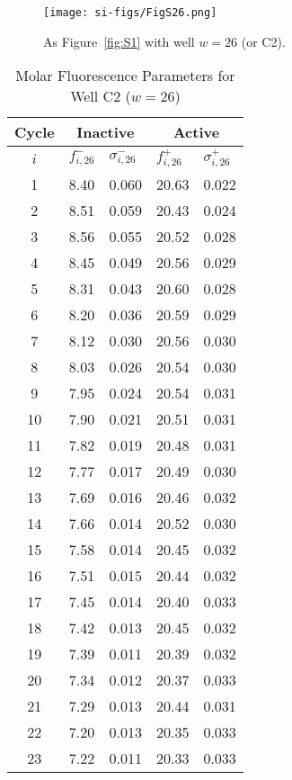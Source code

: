                 \begin{figure}
                    \centering
                    \texttt{[image: si-figs/FigS26.png]}
                    \caption{
                        As Figure~\ref{fig:S1} with well $w=26$ (or C2).
                    }
                \end{figure}
                \clearpage
    \begin{table}
        \caption{Molar Fluorescence Parameters for Well C2 ($w=26$)}
        \centering
        \begin{tabular}{c|ll|ll}
            Cycle & \multicolumn{2}{c|}{Inactive} & \multicolumn{2}{c}{Active} \\
            \hline
            $i$ & $f_{i,26}^{-}$ & $\sigma_{i,26}^{-}$ &  $f_{i,26}^{+}$ & $\sigma_{i,26}^{+}$ \\
            \hline
    1 & 8.40 & 0.060 & 20.63 & 0.022 \\
2 & 8.51 & 0.059 & 20.43 & 0.024 \\
3 & 8.56 & 0.055 & 20.52 & 0.028 \\
4 & 8.45 & 0.049 & 20.56 & 0.029 \\
5 & 8.31 & 0.043 & 20.60 & 0.028 \\
6 & 8.20 & 0.036 & 20.59 & 0.029 \\
7 & 8.12 & 0.030 & 20.56 & 0.030 \\
8 & 8.03 & 0.026 & 20.54 & 0.030 \\
9 & 7.95 & 0.024 & 20.54 & 0.031 \\
10 & 7.90 & 0.021 & 20.51 & 0.031 \\
11 & 7.82 & 0.019 & 20.48 & 0.031 \\
12 & 7.77 & 0.017 & 20.49 & 0.030 \\
13 & 7.69 & 0.016 & 20.46 & 0.032 \\
14 & 7.66 & 0.014 & 20.52 & 0.030 \\
15 & 7.58 & 0.014 & 20.45 & 0.032 \\
16 & 7.51 & 0.015 & 20.44 & 0.032 \\
17 & 7.45 & 0.014 & 20.40 & 0.033 \\
18 & 7.42 & 0.013 & 20.45 & 0.032 \\
19 & 7.39 & 0.011 & 20.39 & 0.032 \\
20 & 7.34 & 0.012 & 20.37 & 0.033 \\
21 & 7.29 & 0.013 & 20.44 & 0.031 \\
22 & 7.20 & 0.013 & 20.35 & 0.033 \\
23 & 7.22 & 0.011 & 20.33 & 0.033 \\

\end{tabular}
\end{table}
